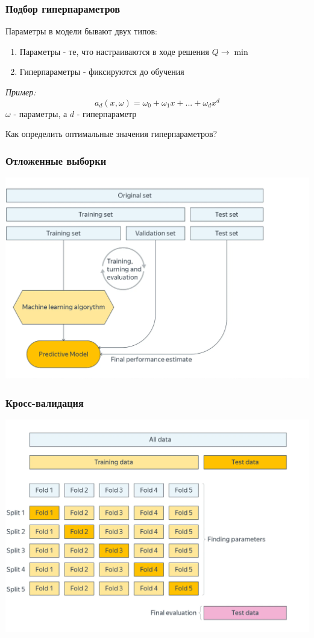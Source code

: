 \documentclass{beamer}
\begin{document}
	\begin{frame}
		\frametitle{Подбор гиперпараметров}
		Параметры в модели бывают двух типов:
		\begin{enumerate}
			\item Параметры - те, что настраиваются в ходе решения $Q \rightarrow \min$
			\item Гиперпараметры - фиксируются до обучения 
		\end{enumerate}
		
		\vspace{15pt}
		
		\textit{Пример:}
		\[
		a_{d}(x, \omega) = \omega_0 + \omega_1 x + ... + \omega_d x^d
		\]
		$\omega$ - параметры, а $d$ - гиперпараметр
		
		\vspace{15pt}
		
		Как определить оптимальные значения гиперпараметров?
	\end{frame}
	
	\begin{frame}
		\frametitle{Отложенные выборки}
		
		\includegraphics[width=1\textwidth]{img/tvt_split.png}
	\end{frame}
	
	\begin{frame}
		\frametitle{Кросс-валидация}
		
		\includegraphics[width=1\textwidth]{img/cv_split.png}
	\end{frame}
	
\end{document}
